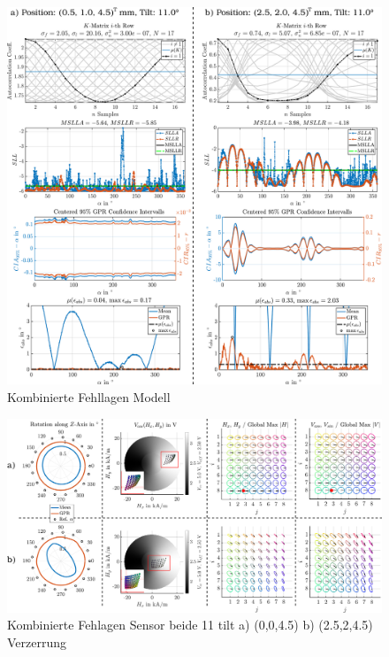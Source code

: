 \clearpage
\begin{figure}[tbph]
	\centering
	\includegraphics[width=\linewidth]{chapters/images/4-EuOExp/Kombinierte-Fehllagen-GPR}
	\caption[Kombinierte Fehllagen Modell]{Kombinierte Fehllagen Modell}
	\label{fig:kombinierte-fehllagen-gpr}
\end{figure}


\clearpage
\begin{landscape}
\begin{figure}[tbph]
	\centering
	\includegraphics[width=\linewidth]{chapters/images/4-EuOExp/Kombinierte-Fehllagen-Sensor}
	\caption[Kombinierte Fehlagen Sensor]{Kombinierte Fehlagen Sensor beide 11 tilt a) (0,0,4.5) b) (2.5,2,4.5) Verzerrung}
	\label{fig:kombinierte-fehllagen-sensor}
\end{figure}	
\end{landscape}


\clearpage


